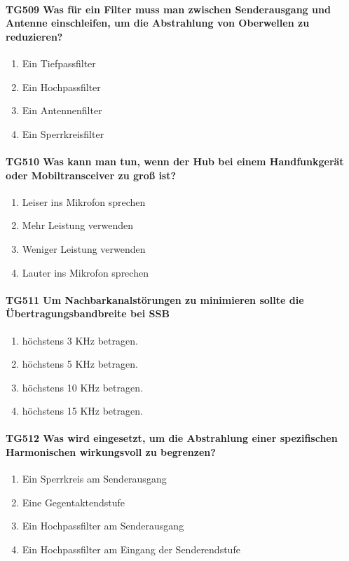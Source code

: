 \documentclass[8pt]{article}
\begin{document}
\paragraph*{TG509 Was für ein Filter muss man zwischen Senderausgang und Antenne einschleifen, um die Abstrahlung von Oberwellen zu reduzieren?} 
\begin{enumerate}[nolistsep,label=\Alph*]
\item Ein Tiefpassfilter
\item Ein Hochpassfilter
\item Ein Antennenfilter
\item Ein Sperrkreisfilter
\end{enumerate}

\paragraph*{TG510 Was kann man tun, wenn der Hub bei einem Handfunkgerät oder Mobiltransceiver zu groß ist?}
\begin{enumerate}[nolistsep,label=\Alph*]
\item Leiser ins Mikrofon sprechen
\item Mehr Leistung verwenden
\item Weniger Leistung verwenden
\item Lauter ins Mikrofon sprechen
\end{enumerate}

\paragraph*{TG511 Um Nachbarkanalstörungen zu minimieren sollte die Übertragungsbandbreite bei SSB} 
\begin{enumerate}[nolistsep,label=\Alph*]
\item höchstens 3 KHz betragen.
\item höchstens 5 KHz betragen.
\item höchstens 10 KHz betragen.
\item höchstens 15 KHz betragen.
\end{enumerate}

\paragraph*{TG512 Was wird eingesetzt, um die Abstrahlung einer spezifischen Harmonischen wirkungsvoll zu begrenzen?}
\begin{enumerate}[nolistsep,label=\Alph*]
\item Ein Sperrkreis am Senderausgang
\item Eine Gegentaktendstufe
\item Ein Hochpassfilter am Senderausgang
\item Ein Hochpassfilter am Eingang der Senderendstufe
\end{enumerate}
\end{document}
